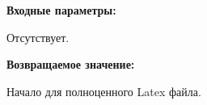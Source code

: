 \textbf{Входные параметры:}

Отсутствует.

\textbf{Возвращаемое значение:}

Начало для полноценного Latex файла.